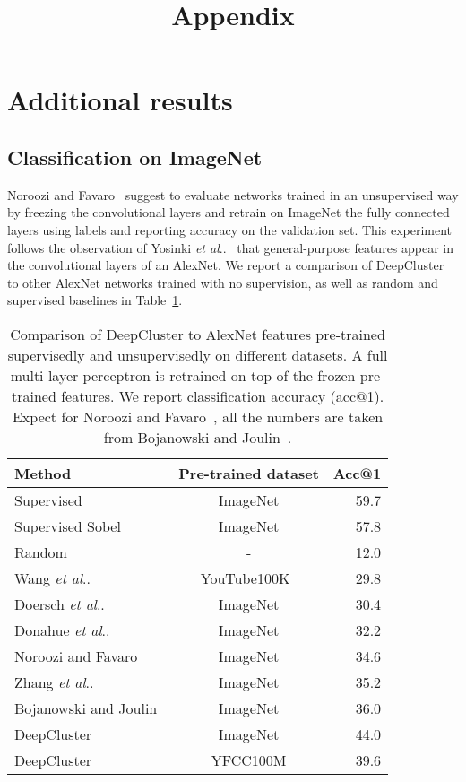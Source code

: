 \documentclass[runningheads]{llncs}
\makeatletter
\DeclareRobustCommand\onedot{\futurelet\@let@token\@onedot}
\def\@onedot{\ifx\@let@token.\else.\null\fi\xspace}
\def\etal{\emph{et al}\onedot}
\def\OURS{DeepCluster\xspace}
\makeatother
\begin{document}
\clearpage




\clearpage
\title{Appendix}
\author{}
\institute{}
\maketitle
\section{Additional results}

\subsection{Classification on ImageNet}
\label{sec:mlpImageNet}
Noroozi and Favaro~\cite{noroozi2016unsupervised} suggest to evaluate networks trained in an unsupervised way by freezing the convolutional layers and retrain on ImageNet the fully connected layers using labels and reporting accuracy on the validation set.
This experiment follows the observation of Yosinki \etal~\cite{yosinski2014transferable} that general-purpose features appear in the convolutional layers of an AlexNet.
We report a comparison of \OURS to other AlexNet networks trained with no supervision, as well as random and supervised baselines in Table~\ref{tab:mlpImageNet}.

\begin{table}[t]
  \centering
  \begin{tabular}{@{}lcr@{}}
    \toprule
    Method & Pre-trained dataset & Acc@1 \\
    \midrule
    Supervised & ImageNet  & 59.7 \\
    Supervised Sobel & ImageNet  & 57.8 \\
    Random & - & 12.0 \\
    \midrule
    Wang \etal~\cite{wang2015unsupervised} & YouTube100K~\cite{LiangLWLLY14} & 29.8 \\
    \midrule
    Doersch \etal~\cite{doersch2015unsupervised} & ImageNet & 30.4 \\
    Donahue \etal~\cite{donahue2016adversarial}  & ImageNet & 32.2 \\
    Noroozi and Favaro~\cite{noroozi2016unsupervised} & ImageNet & 34.6 \\
    Zhang \etal~\cite{zhang2016colorful} & ImageNet & 35.2 \\
    Bojanowski and Joulin~\cite{bojanowski2017unsupervised} & ImageNet & 36.0 \\
    \midrule
\OURS & ImageNet & 44.0 \\
    \OURS & YFCC100M & 39.6 \\
\bottomrule
  \end{tabular}
  \caption{
    Comparison of \OURS to AlexNet features pre-trained supervisedly and unsupervisedly on different datasets.
    A full multi-layer perceptron is retrained on top of the frozen pre-trained features.
    We report classification accuracy (acc@1).
    Expect for Noroozi and Favaro~\cite{noroozi2016unsupervised},
    all the numbers are taken from Bojanowski and Joulin~\cite{bojanowski2017unsupervised}.
  }
  \label{tab:mlpImageNet}
\end{table}
\end{document}
